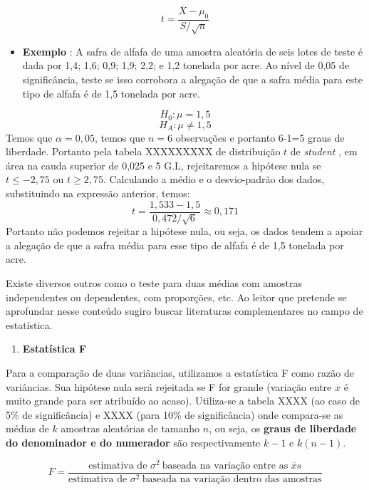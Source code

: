 \documentclass[
  openany]{book}
\providecommand{\tightlist}{%
  \setlength{\itemsep}{0pt}\setlength{\parskip}{0pt}}
\begin{document}
\begin{equation} 
t=\frac{\overline{X}-\mu_0}{S/\sqrt{n}}
  \label{eq:testehipvardesc}
\end{equation}

\begin{itemize}
\tightlist
\item
  \textbf{Exemplo} \citep{freund2009estatistica}: A safra de alfafa de uma amostra aleatória de seis lotes de teste é dada por 1,4; 1,6; 0,9; 1,9; 2,2; e 1,2 tonelada por acre. Ao nível de 0,05 de significância, teste se isso corrobora a alegação de que a safra média para este tipo de alfafa é de 1,5 tonelada por acre.
\end{itemize}

\[H_0: \mu=1,5\]
\[H_A: \mu\neq1,5\]
Temos que \(\alpha=0,05\), temos que \(n=6\) observações e portanto 6-1=5 graus de liberdade. Portanto pela tabela XXXXXXXXX de distribuição \(t\) de \emph{student} , em área na cauda superior de 0,025 e 5 G.L, rejeitaremos a hipótese nula se \(t\leq -2,75\) ou \(t\geq 2,75\). Calculando a médio e o desvio-padrão dos dados, substituindo na expressão anterior, temos:
\[t=\frac{1,533-1,5}{0,472/\sqrt{6}}\approx 0,171\]
Portanto não podemos rejeitar a hipótese nula, ou seja, os dados tendem a apoiar a alegação de que a safra média para esse tipo de alfafa é de 1,5 tonelada por acre.

Existe diversos outros como o teste para duas médias com amostras independentes ou dependentes, com proporções, etc. Ao leitor que pretende se aprofundar nesse conteúdo sugiro buscar literaturas complementares no campo de estatística.

\begin{enumerate}
\def\labelenumi{\arabic{enumi}.}
\setcounter{enumi}{15}
\tightlist
\item
  \textbf{Estatística F}
\end{enumerate}

Para a comparação de duas variâncias, utilizamos a estatística F como razão de variâncias. Sua hipótese nula será rejeitada se F for grande (variação entre \(\overline{x}\) é muito grande para ser atribuído ao acaso). Utiliza-se a tabela XXXX (ao caso de 5\% de significância) e XXXX (para 10\% de significância) onde compara-se as médias de \(k\) amostras aleatórias de tamanho \(n\), ou seja, os \textbf{graus de liberdade do denominador e do numerador} são respectivamente \(k-1\) e \(k(n-1)\).

\begin{equation} 
F=\frac{\mbox{estimativa de }\sigma^2 \ \mbox{baseada na variação entre as }\overline{x}s}{\mbox{estimativa de }  \sigma^2 \ \mbox{baseada na variação dentro das amostras}}
  \label{eq:testef}
\end{equation}
\end{document}
